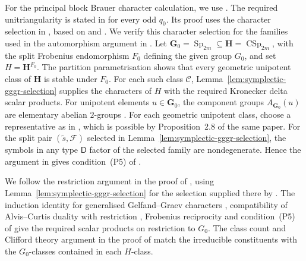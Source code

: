 \documentclass[10pt]{amsart}
\theoremstyle{definition}
\let\oldendproof\endproof
\renewenvironment{proof}[1][\proofname]{%
  \oldproof[\bfseries #1]%
}{\oldendproof}
\DeclareMathOperator{\Sp}{Sp}
\DeclareMathOperator{\CSp}{CSp}
\numberwithin{equation}{section}
\numberwithin{table}{section}
\begin{document}
\begin{proof}
\enlargethispage{3pt}For the principal block Brauer character calculation, we use
\cite[Corollary~4.3]{FengMalle2022}.
The required unitriangularity is stated in
\cite[Theorem~2.9]{Chaneb2021} for every odd $q_0$.
Its proof uses the character selection in
\cite[Proposition~2.8]{Chaneb2021}, based on
\cite[Proposition~4.3]{GeckHezard2008} and
\cite[Proposition~5.4]{Taylor2013}.
We verify this character selection for the families used in the automorphism
argument in \cite[Section~4.1]{FengMalle2022}.
Let $\mathbf G_0=\Sp_{2m}\subseteq\mathbf H=\CSp_{2m}$,
with the split Frobenius endomorphism $F_0$ defining the given
group $G_0$, and set $H=\mathbf H^{F_0}$.
The partition parametrisation shows that every geometric unipotent
class of $\mathbf H$ is stable under $F_0$.
For each such class $\mathcal C$,
Lemma~\ref{lem:symplectic-gggr-selection} supplies the characters
of $H$ with the required Kronecker delta scalar products.
For unipotent elements $u\in\mathbf G_0$, the component groups
$A_{\mathbf G_0}(u)$ are elementary abelian $2$-groups \cite[proof of Proposition~2.4]{Taylor2013}.
For each geometric unipotent class, choose a representative as in
\cite[Definition~2.1]{Taylor2013}, which is possible by
Proposition~2.8 of the same paper.
For the split pair $(\widetilde s,\mathcal F)$ selected in
Lemma~\ref{lem:symplectic-gggr-selection}, the symbols in any type
$\mathsf D$ factor of the selected family are nondegenerate. Hence
the argument in
\cite[10.3]{Taylor2014Maximal} gives condition~\textup{(P5)} of
\cite[Theorem~3.2]{Taylor2013}.

We follow the restriction argument in the proof of
\cite[Proposition~5.4]{Taylor2013}, using
Lemma~\ref{lem:symplectic-gggr-selection} for the selection
supplied there by \cite[Proposition~4.3]{GeckHezard2008}.
The induction identity for generalised Gelfand--Graev characters
\cite[proof of Lemma~14.12]{Taylor2016}, compatibility of Alvis--Curtis duality
with restriction \cite[Proposition~3.4.3]{GeckMalle2020}, Frobenius reciprocity
and condition~\textup{(P5)} of \cite[Theorem~3.2]{Taylor2013}
give the required scalar products on restriction to $G_0$.
The class count and Clifford theory argument in the proof of
\cite[Proposition~5.4]{Taylor2013} match the irreducible constituents
with the $G_0$-classes contained in each $H$-class.


\end{proof}
\end{document}

